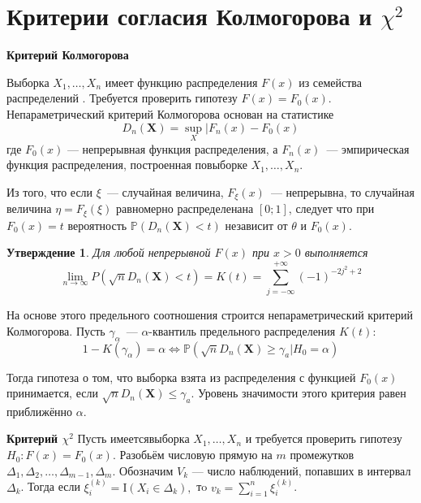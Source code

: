 \documentclass[oneside,final,14pt]{extreport}
\theoremstyle{plain}
\newtheorem*{thm*}{Утверждение}
\theoremstyle{definition}
\theoremstyle{named}
\begin{document}
\section{Критерии согласия Колмогорова и $\chi^{2}$}

{\bf Критерий Колмогорова}

Выборка $X_1, \ldots, X_n$ имеет функцию распределения $F(x)$ из семейства распределений . Требуется проверить гипотезу $F(x)=F_{0}(x)$. Непараметрический критерий Колмогорова основан на статистике
\begin{equation*}
    D_{n}(\mathbf{X})=\sup _{X} | F_{n}(x)-F_{0}(x)
\end{equation*}
где $F_{0}(x)$  —  непрерывная функция распределения, а $F_{n}(x)$~---  эмпирическая функция распределения, построенная повыборке $X_1, \ldots, X_n$.

Из того, что если $\xi$~--- случайная величина, $F_{\xi}(x)$~--- непрерывна, то случайная величина $\eta=F_{\xi}(\xi)$ равномерно распределенана $[0;1]$, следует что при $F_{0}(x)=t$ вероятность $\mathbb{P}\left(D_{n}(\mathbf{X})<t\right)$ независит от $\theta$ и $F_{0}(x)$.

\begin{thm*}
    Для любой непрерывной $F(x)$ при $x > 0$ выполняется
    \begin{equation*}
        \lim _{n \to \infty} P\left(\sqrt{n} D_{n}(\mathbf{X})<t\right)=K(t)=\sum\limits_{j=-\infty}^{+\infty}(-1)^{-2 j^{2}+2}
    \end{equation*}
\end{thm*}

На основе этого предельного соотношения строится непараметрический критерий Колмогорова. Пусть $\gamma_{\alpha}$~--- $\alpha$-квантиль предельного распределения $K(t)$:
\begin{equation*}
    1-K\left(\gamma_{\alpha}\right)=\alpha \Leftrightarrow \mathbb{P}\left(\sqrt{n} D_{n}(\mathbf{X}) \geq \gamma_{a} | H_{0}=\alpha\right)
\end{equation*}

Тогда гипотеза о том, что выборка взята из распределения с функцией $F_{0}(x)$ принимается, если $\sqrt{n} D_{n}(\mathbf{X}) \leqslant \gamma_{a}$. Уровень значимости этого критерия равен приближённо $\alpha$.

{\bf Критерий $\chi^{2}$}
Пусть имеетсявыборка $X_1, \ldots, X_n$ и требуется проверить гипотезу $H_{0}: F(x)=F_{0}(x)$. Разобьём числовую прямую на $m$ промежутков $\Delta_{1}, \Delta_{2}, \ldots, \Delta_{m-1}, \Delta_{m}$. Обозначим $V_{k}$ — число наблюдений, попавших в интервал $\Delta_{k}$. Тогда если $\xi_{i}^{(k)}=\mathrm{I}\left(X_{i} \in \Delta_{k}\right),$ тo $v_{k}=\sum\limits_{i=1}^{n} \xi_{i}^{(k)}$.
\end{document}
